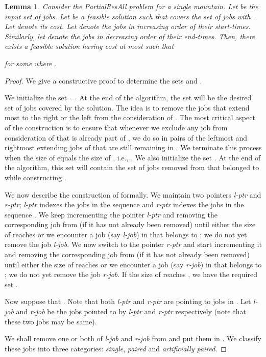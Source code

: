 \documentclass[11pt]{article}
\newtheorem{lemma}[theorem]{Lemma}
\newtheorem{proof}[theorem]{Proof}
\newcommand{\PResAll}{{\sc PartialResAll}}
\newcommand{\lptr}{{\em l-ptr}}
\newcommand{\rptr}{{\em r-ptr}}
\newcommand{\ljob}{{\em l-job}}
\newcommand{\rjob}{{\em r-job}}
\begin{document}
\begin{lemma}
\label{BBB}
Consider the {\PResAll} problem for a single mountain.
Let  be the input set of jobs.
Let  be a feasible solution such that  covers the set of jobs  with . 
Let  denote its cost.
Let  denote the jobs in increasing order of their start-times.
Similarly, let  denote the jobs in decreasing order of their end-times.
Then, there exists a feasible solution  having cost at most  such that

for some  where .
\end{lemma}
\begin{proof}
We give a constructive proof to determine the sets  and .


We initialize the set =. At the end of the algorithm, 
the set  will be the desired set of jobs covered by the solution.
The idea is to remove the jobs that extend most to the right or the left from the consideration of .
The most critical aspect of the construction is to ensure that whenever we exclude any job from consideration
of  that is already part of , we do so in pairs of the leftmost and rightmost extending jobs of 
that are still remaining in . 
We terminate this process when the size of  equals the size of , i.e., .
We also initialize the set . 
At the end of the algorithm, this set will contain the set of jobs removed from  that belonged to 
while constructing .

We now describe the construction of  formally.
We maintain two pointers {\lptr} and {\rptr}; {\lptr} indexes the jobs in the sequence  
and {\rptr} indexes the jobs in the sequence .
We keep incrementing the pointer {\lptr} and removing the corresponding job from  
(if it has not already been removed) until either the size of  reaches  
or we encounter a job (say {\ljob}) in  that belongs to ;  we do not yet remove the job {\ljob}.
We now switch to the pointer {\rptr} and start incrementing it and removing the corresponding job from  
(if it has not already been removed) until either the size of  reaches  
or we encounter a job (say {\rjob}) in  that belongs to ;  we do not yet remove the job {\rjob}.
If the size of  reaches , we have the required set . 

Now suppose that .
Note that both {\lptr} and {\rptr} are pointing to jobs in .
Let {\ljob} and {\rjob} be the jobs pointed to by {\lptr} and {\rptr} respectively (note that 
these two jobs may be same).

We shall remove one or both of {\ljob} and {\rjob} from  and put them in . 
We classify these jobs into three categories: {\em single}, {\em paired} and {\em artificially paired}.


\end{proof}
\end{document}
